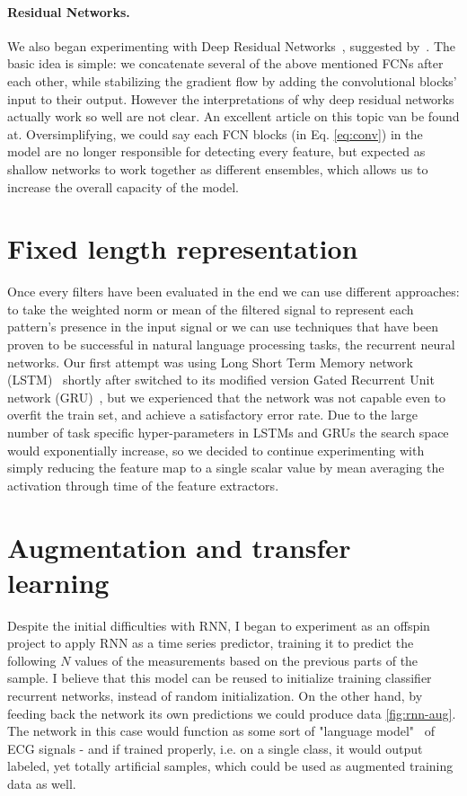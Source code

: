 \paragraph{Residual Networks.}
We also began experimenting with Deep Residual Networks~\cite{he2016deep}, suggested by~\cite{wang2016time}.
The basic idea is simple: we concatenate several of the above mentioned FCNs after each other, while stabilizing the gradient flow by adding the convolutional blocks' input to their output.
However the interpretations of why deep residual networks actually work so well are not clear.
An excellent article on this topic van be found at\cite{resnet-ensembles}.
Oversimplifying, we could say each FCN blocks (in Eq. \ref{eq:conv}) in the model are no longer responsible for detecting every feature, but expected as shallow networks to work together as different ensembles, which allows us to increase the overall capacity of the model.

\section{Fixed length representation}
Once every filters have been evaluated in the end we can use different approaches: to take the weighted norm or mean of the filtered signal to represent each pattern's presence in the input signal or we can use techniques that have been proven to be successful in natural language processing tasks, the recurrent neural networks.
Our first attempt was using Long Short Term Memory network (LSTM)~\cite{hochreiter1997long, malhotra2015long} shortly after switched to its modified version Gated Recurrent Unit network (GRU)~\cite{chung2014empirical}, but we experienced that the network was not capable even to overfit the train set, and achieve a satisfactory error rate.
Due to the large number of task specific hyper-parameters in LSTMs and GRUs the search space would exponentially increase, so we decided to continue experimenting with simply reducing the feature map to a single scalar value by mean averaging the activation through time of the feature extractors.

\section{Augmentation and transfer learning}
Despite the initial difficulties with RNN, I began to experiment as an offspin project to apply RNN as a time series predictor, training it to predict the following $N$ values of the measurements based on the previous parts of the sample. I believe that this model can be reused to initialize training classifier recurrent networks, instead of random initialization.
On the other hand, by feeding back the network its own predictions we could produce data \ref{fig:rnn-aug}. The network in this case would function as some sort of "language model"~\cite{lang-model} of ECG signals - and if trained properly, i.e. on a single class, it would output labeled, yet totally artificial samples, which could be used as augmented training data as well.


